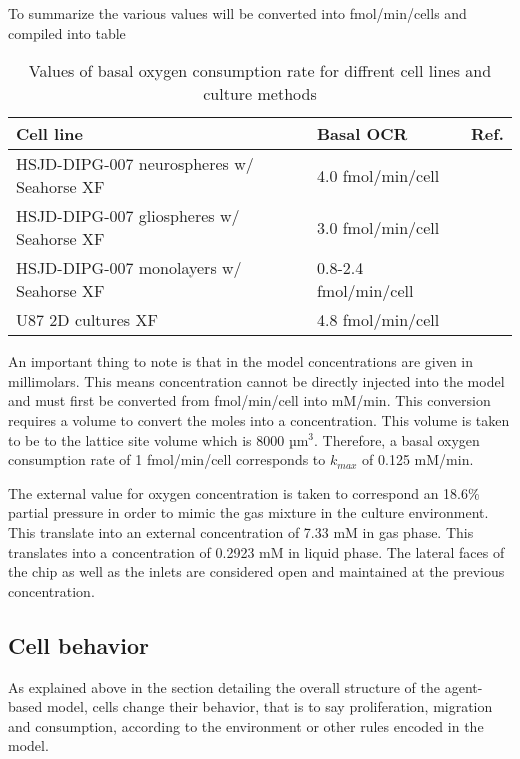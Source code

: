 \documentclass[11pt,a4paper]{article}
\begin{document}
To summarize the various values will be converted into fmol/min/cells and compiled into  table 
\begin{table}
\begin{center}
\begin{tabular}{ |p{50mm}|p{50mm}|p{15mm} |}
\hline
 \textbf{Cell line}  & \textbf{Basal OCR } & Ref. \\
 \hline
  \hline
 HSJD-DIPG-007 neurospheres w/ Seahorse XF & 4.0 fmol/min/cell & \cite{Shen2019}\\
 \hline 
  HSJD-DIPG-007 gliospheres w/ Seahorse XF & 3.0 fmol/min/cell & \cite{Mbah2022}\\
 \hline 
  HSJD-DIPG-007 monolayers w/ Seahorse XF & 0.8-2.4 fmol/min/cell & \cite{Shen2024}\\
 \hline 
   U87 2D cultures XF & 4.8 fmol/min/cell & \cite{Ruas2018}\\
 \hline 
\end{tabular}
\caption{Values of basal oxygen consumption rate for diffrent cell lines and culture methods\label{tab:ocr}}
\end{center}
\end{table}

An important thing to note is that in the model concentrations are given in millimolars. This means concentration cannot be directly injected into the model and must first  be converted from fmol/min/cell into mM/min. This conversion requires a volume to convert the moles into a concentration. This volume is taken to be to the lattice site volume which is 8000 µm$^3$. Therefore, a basal oxygen consumption rate of 1 fmol/min/cell corresponds to $k_{max}$ of  0.125 mM/min.

The external value for oxygen concentration is taken to correspond an 18.6\% partial pressure in order to mimic the gas mixture in the culture environment. This translate into an external concentration of 7.33 mM in gas phase. This translates into a concentration of 0.2923 mM in liquid phase. The lateral faces of the chip as well as the  inlets are considered open and maintained at the previous concentration.

\subsection{Cell behavior}
As explained above in the section detailing the overall structure of the agent-based model, cells change their behavior, that is to say proliferation, migration and consumption, according to the environment or other rules encoded in the model.
\end{document}
